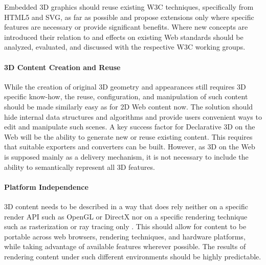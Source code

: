 \documentclass{acmsiggraph}
\begin{document}
Embedded 3D graphics should reuse existing W3C techniques, specifically from HTML5 and SVG, as far as possible and propose extensions only where specific features are necessary or provide significant benefits. Where new concepts are introduced their relation to and effects on existing Web standards should be analyzed, evaluated, and discussed with the respective W3C working groups.

\paragraph{3D Content Creation and Reuse}
While the creation of original 3D geometry and appearances still requires 3D specific know-how, the reuse, configuration, and manipulation of such content should be made similarly easy as for 2D Web content now. The solution should hide internal data structures and algorithms and provide users convenient ways to edit and manipulate such scenes.
A key success factor for Declarative 3D on the Web will be the ability to generate new or reuse existing content. This requires that suitable exporters and converters can be built. However, as 3D on the Web is supposed mainly as a delivery mechanism, it is not necessary to include the ability to semantically represent all 3D features.

\paragraph{Platform Independence}
3D content needs to be described in a way that does rely neither on a specific render API such as OpenGL or DirectX nor on a specific rendering technique such as rasterization or ray tracing only \cite{Rubinstein:2009,Schwenk12}. This should allow for content to be portable across web browsers, rendering techniques, and hardware platforms, while taking advantage of available features wherever possible. The results of rendering content under such different environments should be highly predictable.
\end{document}
